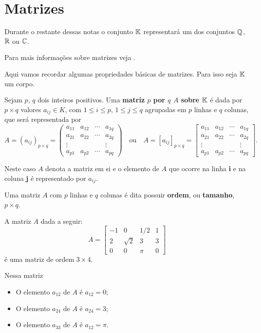 \section{Matrizes}

Durante o restante dessas notas o conjunto $\mathbb{K}$ representará um dos conjuntos $\mathbb{Q}$, $\mathbb{R}$ ou $\mathbb{C}$.

Para mais informações sobre matrizes veja \cite{Boldrini:1980, Callioli:2009, Anton:2012}.

Aqui vamos recordar algumas propriedades básicas de matrizes. Para isso seja $\mathbb{K}$ um corpo.

Sejam $p$, $q$ dois inteiros positivos. Uma \textbf{matriz $p$ por $q$ $A$ sobre $\mathbb{K}$} é dada por $p \times q$ valores $a_{ij} \in K$, com $1 \le i \le p$, $1 \le j \le q$ agrupadas em $p$ linhas e $q$ colunas, que será representada por
\[
  A = (a_{ij})_{p\times q} = \begin{pmatrix}
    a_{11} & a_{12} & \cdots & a_{1q}\\
    a_{21} & a_{22} & \cdots & a_{2q}\\
    \vdots & & & \vdots\\
    a_{p1} & a_{p2} & \cdots & a_{pq}
  \end{pmatrix} \quad\mbox{ou}\quad
  A = [a_{ij}]_{p\times q} = \begin{bmatrix}
    a_{11} & a_{12} & \cdots & a_{1q}\\
    a_{21} & a_{22} & \cdots & a_{2q}\\
    \vdots & & & \vdots\\
    a_{p1} & a_{p2} & \cdots & a_{pq}
  \end{bmatrix}.
\]

Neste caso $A$ denota a matriz em si e o elemento de $A$ que ocorre na linha \textbf{i} e na coluna \textbf{j} é representado por $a_{ij}$.

Uma matriz $A$ com $p$ linhas e $q$ colunas é dita possuir \textbf{ordem}, ou \textbf{tamanho}, $p\times q$.

\begin{exemplo}
  A matriz $A$ dada a seguir:
  \[
    A = \begin{bmatrix}
      -1 & 0 & 1/2 & 1\\
      2 & \sqrt{2} & 3 & 3\\
      0 & 0 & \pi & 0
    \end{bmatrix}
  \]
  é uma matriz de ordem $3 \times 4$.

  Nessa matriz
  \begin{itemize}
    \item O elemento $a_{12}$ de $A$ é $a_{12} = 0$;

    \item O elemento $a_{24}$ de $A$ é $a_{24} = 3$;

    \item O elemento $a_{33}$ de $A$ é $a_{12} = \pi$.
  \end{itemize}
\end{exemplo}

